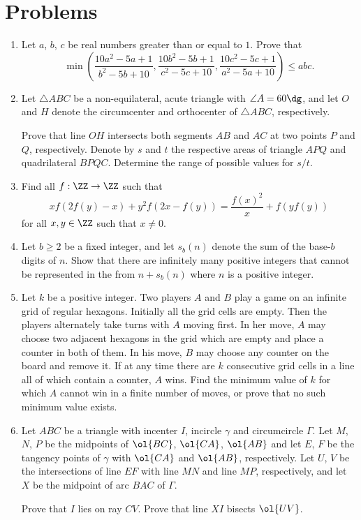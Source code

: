 \documentclass[11pt]{scrartcl}
\begin{document}
\section{Problems}
\begin{enumerate}[\bfseries 1.]
\item %
Let $a$, $b$, $c$ be real numbers greater than or equal to $1$.
Prove that
\[ \min \left( \frac{10a^2-5a+1}{b^2-5b+10},
  \frac{10b^2-5b+1}{c^2-5c+10},
  \frac{10c^2-5c+1}{a^2-5a+10} \right) \le abc. \]

\item %
Let $\triangle ABC $ be a non-equilateral,
acute triangle with $\angle A = 60\dg$,
and let $O$ and $H$ denote the circumcenter and orthocenter
of $\triangle{ABC}$, respectively.
\begin{enumerate}[(a)]
  \ii Prove that line $OH$ intersects both segments $AB$ and $AC$
  at two points $P$ and $Q$, respectively.
  \ii Denote by $s$ and $t$ the respective areas of triangle $APQ$
  and quadrilateral $BPQC$.
  Determine the range of possible values for $s/t$.
\end{enumerate}

\item %
Find all $f :\ZZ \to \ZZ$ such that
\[
  xf\left( 2f(y)-x \right) + y^2f\left( 2x-f(y) \right)
  = \frac{f(x)^2}{x} + f\left( yf(y) \right)
\]
for all $x,y \in \ZZ$ such that $x \neq 0$.

\item %
Let $b \ge 2$ be a fixed integer,
and let $s_b(n)$ denote the sum of the base-$b$ digits of $n$.
Show that there are infinitely many positive
integers that cannot be represented in the from $n + s_b(n)$
where $n$ is a positive integer.

\item %
Let $k$ be a positive integer.
Two players $A$ and $B$ play a game on an infinite grid of regular hexagons.
Initially all the grid cells are empty.
Then the players alternately take turns with $A$ moving first.
In her move, $A$ may choose two adjacent hexagons in the grid
which are empty and place a counter in both of them.
In his move, $B$ may choose any counter on the board and remove it.
If at any time there are $k$ consecutive grid cells
in a line all of which contain a counter, $A$ wins.
Find the minimum value of $k$ for which $A$ cannot
win in a finite number of moves, or prove that no such minimum value exists.

\item %
Let $ABC$ be a triangle with incenter $I$,
incircle $\gamma$ and circumcircle $\Gamma$.
Let $M$, $N$, $P$ be the midpoints of $\ol{BC}$, $\ol{CA}$, $\ol{AB}$
and let $E$, $F$ be the tangency points of $\gamma$
with $\ol{CA}$ and $\ol{AB}$, respectively.
Let $U$, $V$ be the intersections of line $EF$
with line $MN$ and line $MP$, respectively,
and let $X$ be the midpoint of arc $BAC$ of $\Gamma$.
\begin{enumerate}[(a)]
  \ii Prove that $I$ lies on ray $CV$.
  \ii Prove that line $XI$ bisects $\ol{UV}$.
\end{enumerate}

\end{enumerate}
\pagebreak
\end{document}
